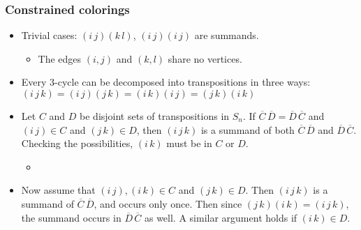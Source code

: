 \documentclass{beamer}
\begin{document}
\begin{frame}
\frametitle{Constrained colorings}
\begin{itemize}
\item Trivial cases: $(i\,j)(k\,l)$, $(i\,j)(i\,j)$ are
  summands.
\begin{itemize}
\item The edges $(i, j)$ and $(k, l)$ share no vertices.\pause
\end{itemize}
\item Every 3-cycle can be decomposed into transpositions in three
  ways: $(i\,j\,k)=(i\,j)(j\,k)=(i\,k)(i\,j)=(j\,k)(i\,k)$\pause
\item Let $C$ and $D$ be disjoint sets of transpositions in $S_n$. If
  $\overline{C}\,\overline{D} = \overline{D}\,\overline{C}$ and
  $(i\,j)\in C$ and $(j\,k)\in D$, then $(i\,j\,k)$ is a summand of
  both $\overline{C}\,\overline{D}$ and
  $\overline{D}\,\overline{C}$. Checking the possibilities, $(i\,k)$
  must be in $C$ or $D$.\pause
\begin{itemize}
\item {}\pause
\end{itemize}
\item Now assume that $(i\,j), (i\,k)\in C$ and $(j\,k)\in D$. Then
  $(i\,j\,k)$ is a summand of $\overline{C}\,\overline{D}$, and occurs
  only once. Then since $(j\,k)(i\,k) = (i\,j\,k)$, the summand occurs
  in $\overline{D}\,\overline{C}$ as well. A similar argument holds if
  $(i\,k)\in D$.
\end{itemize}
\end{frame}

\end{document}
